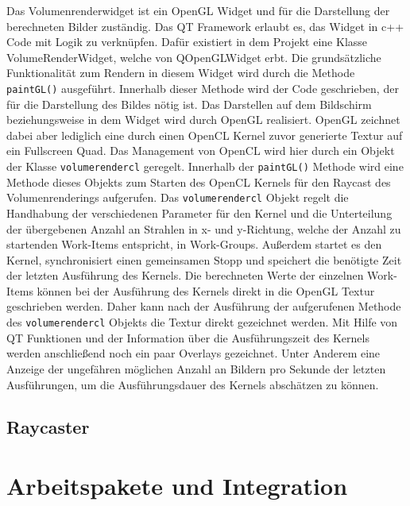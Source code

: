 Das Volumenrenderwidget ist ein OpenGL Widget und für die Darstellung der berechneten Bilder zuständig.
Das QT Framework erlaubt es, das Widget in c++ Code mit Logik zu verknüpfen.
Dafür existiert in dem Projekt eine Klasse VolumeRenderWidget, welche von QOpenGLWidget erbt.
Die grundsätzliche Funktionalität zum Rendern in diesem Widget wird durch die Methode \texttt{paintGL()} ausgeführt.
Innerhalb dieser Methode wird der Code geschrieben, der für die Darstellung des Bildes nötig ist.
Das Darstellen auf dem Bildschirm beziehungsweise in dem Widget wird durch OpenGL realisiert.
OpenGL zeichnet dabei aber lediglich eine durch einen OpenCL Kernel zuvor generierte Textur auf ein Fullscreen Quad.
Das Management von OpenCL wird hier durch ein Objekt der Klasse \texttt{volumerendercl} geregelt.
Innerhalb der \texttt{paintGL()} Methode wird eine Methode dieses Objekts zum Starten des OpenCL Kernels für den Raycast des Volumenrenderings aufgerufen.
Das \texttt{volumerendercl} Objekt regelt die Handhabung der verschiedenen Parameter für den Kernel und die Unterteilung der übergebenen Anzahl an Strahlen in x- und y-Richtung, welche der Anzahl zu startenden Work-Items entspricht, in Work-Groups.
Außerdem startet es den Kernel, synchronisiert einen gemeinsamen Stopp und speichert die benötigte Zeit der letzten Ausführung des Kernels.
Die berechneten Werte der einzelnen Work-Items können bei der Ausführung des Kernels direkt in die OpenGL Textur geschrieben werden.
Daher kann nach der Ausführung der aufgerufenen Methode des \texttt{volumerendercl} Objekts die Textur direkt gezeichnet werden.
Mit Hilfe von QT Funktionen und der Information über die Ausführungszeit des Kernels werden anschließend noch ein paar Overlays gezeichnet.
Unter Anderem eine Anzeige der ungefähren möglichen Anzahl an Bildern pro Sekunde der letzten Ausführungen, um die Ausführungsdauer des Kernels abschätzen zu können.

\subsection*{Raycaster}

\section{Arbeitspakete und Integration}\label{sec::workpacks}
